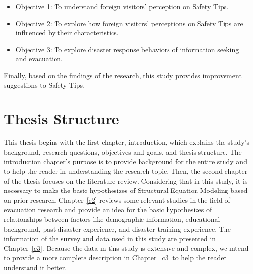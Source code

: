 \begin{itemize}
\item Objective 1: To understand foreign visitors' perception on Safety Tips.
\item Objective 2: To explore how foreign visitors' perceptions on Safety Tips are influenced by their characteristics.
\item Objective 3: To explore disaster response behaviors of information seeking and evacuation.
\end{itemize}

Finally, based on the findings of the research, this study provides improvement suggestions to Safety Tips.


\section{Thesis Structure} 

This thesis begins with the first chapter, introduction, which explains the study's background, research questions, objectives and goals, and thesis structure. The introduction chapter's purpose is to provide background for the entire study and to help the reader in understanding the research topic. Then, the second chapter of the thesis focuses on the literature review. Considering that in this study, it is necessary to make the basic hypothesizes of Structural Equation Modeling based on prior research, Chapter~\ref{c2} reviews some relevant studies in the field of evacuation research and provide an idea for the basic hypothesizes of relationships between factors like demographic information, educational background, past disaster experience, and disaster training experience. The information of the survey and data used in this study are presented in Chapter~\ref{c3}. Because the data in this study is extensive and complex, we intend to provide a more complete description in Chapter~\ref{c3} to help the reader understand it better. 

